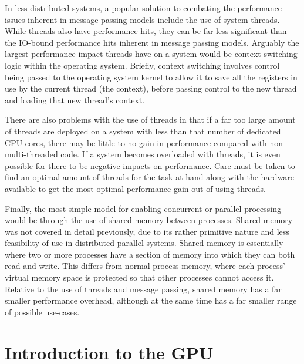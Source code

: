 \documentclass[a4paper,11pt]{article}
\begin{document}
In less distributed systems, a popular solution to combating the performance issues inherent in message passing models include
the use of system threads. While threads also have performance hits, they can be far less significant than the IO-bound
performance hits inherent in message passing models. Arguably the largest performance impact threads have on a system
would be context-switching logic within the operating system. Briefly, context switching involves control being passed to
the operating system kernel to allow it to save all the registers in use by the current thread (the context), before passing control
to the new thread and loading that new thread's context.

There are also problems with the use of threads in that if a far too large amount of threads are deployed on a system with less than that
number of dedicated CPU cores, there may be little to no gain in performance compared with non-multi-threaded code. If a system becomes
overloaded with threads, it is even possible for there to be negative impacts on performance. Care must be taken to find
an optimal amount of threads for the task at hand along with the hardware available to get the most optimal performance gain
out of using threads.

Finally, the most simple model for enabling concurrent or parallel processing would be through the use of shared memory
between processes. Shared memory was not covered in detail previously, due to its rather primitive nature and less feasibility
of use in distributed parallel systems. Shared memory is essentially where two or more processes have a section of memory
into which they can both read and write. This differs from normal process memory, where each process' virtual memory space is
protected so that other processes cannot access it. Relative to the use of threads and message passing, shared memory has
a far smaller performance overhead, although at the same time has a far smaller range of possible use-cases.





\newpage


\section{Introduction to the GPU} %
\label{sec:introduction_to_the_gpu}
\end{document}
